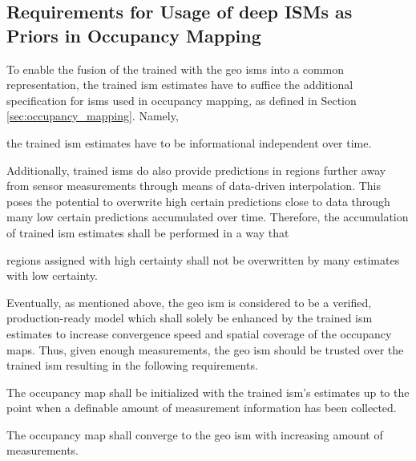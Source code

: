 \subsection{Requirements for Usage of deep ISMs as Priors in Occupancy Mapping}
\label{subsec:requirements_for_usage_of_deep_ims_as_priors_in_occmapping}
To enable the fusion of the trained with the geo \gls{ism}s into a common representation, the trained \gls{ism} estimates have to suffice the additional specification for \gls{ism}s used in occupancy mapping, as defined in Section \ref{sec:occupancy_mapping}. Namely,
\\
\setcounter{req}{2}
\setcounter{subreq}{0}
\begin{subreq} \label{subreq:indep_info}
	the trained \gls{ism} estimates have to be informational independent over time.
\end{subreq}
Additionally, trained \gls{ism}s do also provide predictions in regions further away from sensor measurements through means of data-driven interpolation. This poses the potential to overwrite high certain predictions close to data through many low certain predictions accumulated over time. Therefore, the accumulation of trained \gls{ism} estimates shall be performed in a way that
\\
\begin{subreq} \label{subreq:no_falsification}
	regions assigned with high certainty shall not be overwritten by many estimates with low certainty. 
\end{subreq}
Eventually, as mentioned above, the geo \gls{ism} is considered to be a verified, production-ready model which shall solely be enhanced by the trained \gls{ism} estimates to increase convergence speed and spatial coverage of the occupancy maps. Thus, given enough measurements, the geo \gls{ism} should be trusted over the trained \gls{ism} resulting in the following requirements.
\\
\begin{subreq} \label{subreq:initialize_with_deep_ism}
	The occupancy map shall be initialized with the trained \gls{ism}'s estimates up to the point when a definable amount of measurement information has been collected.
\end{subreq}
\vspace{\baselineskip}
\begin{subreq} \label{subreq:converge_to_geo_ism}
	The occupancy map shall converge to the geo \gls{ism} with increasing amount of measurements.
\end{subreq}
%
